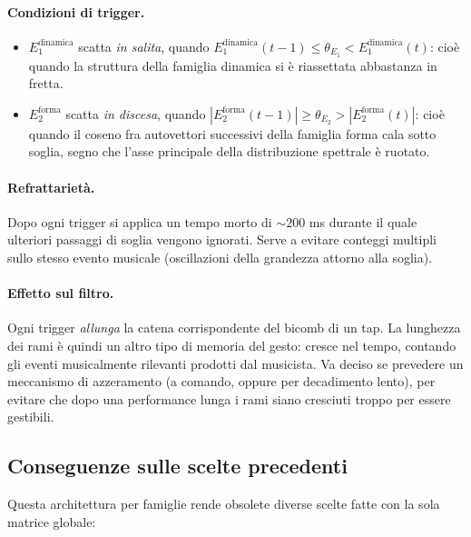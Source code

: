 \documentclass[a4paper,11pt]{article}
\begin{document}
\paragraph{Condizioni di trigger.}
\begin{itemize}[nosep]
  \item $E_1^{\text{dinamica}}$ scatta \emph{in salita}, quando
        $E_1^{\text{dinamica}}(t-1) \le \theta_{E_1} < E_1^{\text{dinamica}}(t)$:
        cioè quando la struttura della famiglia dinamica si è
        riassettata abbastanza in fretta.
  \item $E_2^{\text{forma}}$ scatta \emph{in discesa},
        quando $|E_2^{\text{forma}}(t-1)| \ge \theta_{E_2} > |E_2^{\text{forma}}(t)|$:
        cioè quando il coseno fra autovettori successivi della famiglia
        forma cala sotto soglia, segno che l'asse principale della
        distribuzione spettrale è ruotato.
\end{itemize}

\paragraph{Refrattarietà.}
Dopo ogni trigger si applica un tempo morto di $\sim 200$ ms durante il
quale ulteriori passaggi di soglia vengono ignorati. Serve a evitare
conteggi multipli sullo stesso evento musicale (oscillazioni della
grandezza attorno alla soglia).

\paragraph{Effetto sul filtro.}
Ogni trigger \emph{allunga} la catena corrispondente del bicomb di un
tap. La lunghezza dei rami è quindi un altro tipo di memoria del
gesto: cresce nel tempo, contando gli eventi musicalmente rilevanti
prodotti dal musicista. Va deciso se prevedere un meccanismo di
azzeramento (a comando, oppure per decadimento lento), per evitare che
dopo una performance lunga i rami siano cresciuti troppo per essere
gestibili.

\subsection{Conseguenze sulle scelte precedenti}

Questa architettura per famiglie rende obsolete diverse scelte fatte
con la sola matrice globale:
\end{document}
